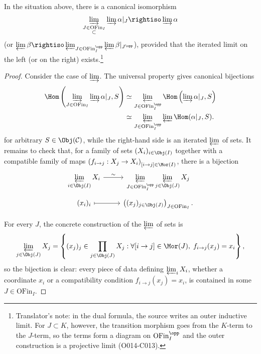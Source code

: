 \begin{proposition}\label{prop:limit-filtered-approx}
	In the situation above, there is a canonical isomorphism
	\[ \varinjlim_{\substack{J \in \mathrm{OFin}_I \\ \subset}} \varinjlim \alpha|_J \rightiso \varinjlim \alpha \]
	(or $\varprojlim \beta \rightiso
	\varprojlim_{J \in \mathrm{OFin}_I^{\opp}}
	\varprojlim \beta|_{J^{\opp}}$), provided that the iterated limit on the
	left (or on the right) exists.\footnote{Translator's note: in the dual
	formula, the source writes an outer inductive limit. For $J\subset K$,
	however, the transition morphism goes from the $K$-term to the $J$-term, so
	the terms form a diagram on $\mathrm{OFin}_I^{\opp}$ and the outer
	construction is a projective limit (O014-C013).}
\end{proposition}
\begin{proof}
	Consider the case of $\varinjlim$. The universal property gives
	canonical bijections
	\[ \begin{aligned}
	\Hom\left( \varinjlim_{J\in\mathrm{OFin}_I} \varinjlim \alpha|_J, S \right)
	&\simeq \varprojlim_{J\in\mathrm{OFin}_I^{\opp}}
	\Hom\left( \varinjlim \alpha|_J, S \right) \\
	&\simeq \varprojlim_{J\in\mathrm{OFin}_I^{\opp}}
	\varprojlim \Hom(\alpha|_J, S) .
	\end{aligned} \]
	for arbitrary $S \in \Obj(\mathcal{C})$, while the right-hand side is an
	iterated $\varprojlim$ of sets. It remains to check that, for a family of
	sets $(X_i)_{i \in \Obj(I)}$ together with a compatible family of maps
	$\left( f_{i \to j}: X_j \to X_i \right)_{[i \to j] \in \Mor(I)}$, there
	is a bijection
	\[\begin{tikzcd}[row sep=tiny]
		\displaystyle\varprojlim_{i \in \Obj(I)} X_i \arrow[r, "\sim"] & \displaystyle\varprojlim_{J \in \mathrm{OFin}_I^{\opp}} \displaystyle\varprojlim_{j \in \Obj(J)} X_j \\
		(x_i)_i \arrow[mapsto, r] & \left( (x_j)_{j \in \Obj(J)} \right)_{J \in \mathrm{OFin}_I} .
	\end{tikzcd}\]

	For every $J$, the concrete construction of the $\varprojlim$ of sets is
	\[ \varprojlim_{j \in \Obj(J)} X_j = \left\{ (x_j)_j \in \prod_{j \in \Obj(J)} X_j : \forall [i \to j] \in \Mor(J), \; f_{i \to j}(x_j) = x_i \right\}, \]
	so the bijection is clear: every piece of data defining $\varprojlim_i X_i$,
	whether a coordinate $x_i$ or a compatibility condition
	$f_{i \to j}(x_j) = x_i$, is contained in some $J \in \mathrm{OFin}_I$.
\end{proof}

